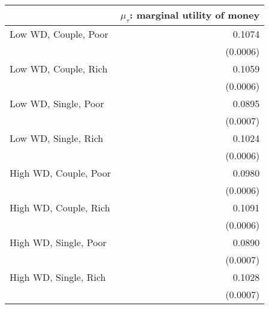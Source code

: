 \begin{tabular}{lr} 
\toprule 
                                & $\mu_\tau$: marginal utility of money  \\ 
\midrule 
          Low WD, Couple, Poor  &       0.1074  \\ 
                                & (0.0006)  \\ 
          Low WD, Couple, Rich  &       0.1059  \\ 
                                & (0.0006)  \\ 
          Low WD, Single, Poor  &       0.0895  \\ 
                                & (0.0007)  \\ 
          Low WD, Single, Rich  &       0.1024  \\ 
                                & (0.0006)  \\ 
         High WD, Couple, Poor  &       0.0980  \\ 
                                & (0.0006)  \\ 
         High WD, Couple, Rich  &       0.1091  \\ 
                                & (0.0006)  \\ 
         High WD, Single, Poor  &       0.0890  \\ 
                                & (0.0007)  \\ 
         High WD, Single, Rich  &       0.1028  \\ 
                                & (0.0007)  \\ 
\bottomrule \end{tabular} 
